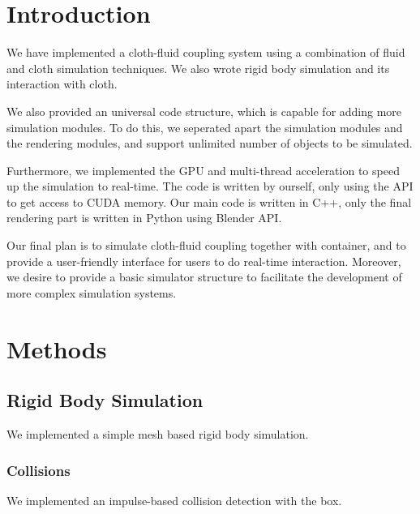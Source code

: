 \section{Introduction}

We have implemented a cloth-fluid coupling system using a combination of fluid and cloth simulation techniques. We also wrote rigid body simulation and its interaction with cloth. 

We also provided an universal code structure, which is capable for adding more simulation modules. To do this, we seperated apart the simulation modules and the rendering modules, and support unlimited number of objects to be simulated.

Furthermore, we implemented the GPU and multi-thread acceleration to speed up the simulation to real-time. The code is written by ourself, only using the API to get access to CUDA memory. Our main code is written in C++, only the final rendering part is written in Python using Blender API.

Our final plan is to simulate cloth-fluid coupling together with container, and to provide a user-friendly interface for users to do real-time interaction. Moreover, we desire to provide a basic simulator structure to facilitate the development of more complex simulation systems.
\section{Methods}

\subsection{Rigid Body Simulation}

We implemented a simple mesh based rigid body simulation. 

\subsubsection{Collisions}

We implemented an impulse-based collision detection with the box.

